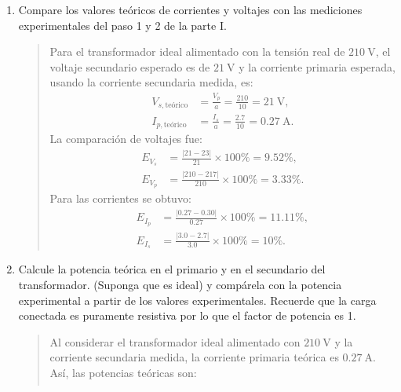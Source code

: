 \documentclass[12pt,a4paper]{article}
\begin{document}
\begin{enumerate}
\begin{quote}
        Los transformadores reductores se utilizan en subestaciones de distribución, fuentes de alimentación y circuitos de control para disminuir la tensión a niveles adecuados para las cargas. Los transformadores elevadores se utilizan principalmente en las centrales eléctricas y en subestaciones de transmisión para aumentar la tensión y reducir la corriente durante el transporte de energía eléctrica.
    \end{quote}
    \item Compare los valores teóricos de corrientes y voltajes con las mediciones experimentales del paso 1 y 2 de la parte I.
    \begin{quote}
        Para el transformador ideal alimentado con la tensión real de $\SI{210}{\volt}$, el voltaje secundario esperado es de $\SI{21}{\volt}$ y la corriente primaria esperada, usando la corriente secundaria medida, es:
        \begin{align*}
            V_{s,\text{teórico}}&=\frac{V_p}{a}=\frac{210}{10}=\SI{21}{\volt},\\
            I_{p,\text{teórico}}&=\frac{I_s}{a}=\frac{2.7}{10}=\SI{0.27}{\ampere}.
        \end{align*}
        La comparación de voltajes fue:
        \begin{align*}
            E_{V_s}&=\frac{|21-23|}{21}\times100\%=9.52\%,\\
            E_{V_p}&=\frac{|210-217|}{210}\times100\%=3.33\%.
        \end{align*}
        Para las corrientes se obtuvo:
        \begin{align*}
            E_{I_p}&=\frac{|0.27-0.30|}{0.27}\times100\%=11.11\%,\\
            E_{I_s}&=\frac{|3.0-2.7|}{3.0}\times100\%=10\%.
        \end{align*}
    \end{quote}
    \item Calcule la potencia teórica en el primario y en el secundario del transformador. (Suponga que es ideal) y compárela con la potencia experimental a partir de los valores experimentales. Recuerde que la carga conectada es puramente resistiva por lo que el factor de potencia es 1.
    \begin{quote}
        Al considerar el transformador ideal alimentado con $\SI{210}{\volt}$ y la corriente secundaria medida, la corriente primaria teórica es $\SI{0.27}{\ampere}$. Así, las potencias teóricas son:
        \begin{align*}

\end{align*}
\end{quote}
\end{enumerate}
\end{document}
